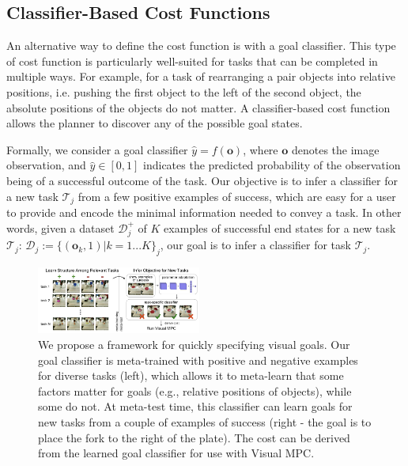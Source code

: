 \subsection{Classifier-Based Cost Functions}
\label{subsec:class_cost}
An alternative way to define the cost function is with a goal classifier. This type of cost function is particularly well-suited for tasks that can be completed in multiple ways. For example, for a task of rearranging a pair objects into relative positions, i.e. pushing the first object to the left of the second object, the absolute positions of the objects do not matter. A classifier-based cost function allows the planner to discover any of the possible goal states.

\newcommand{\task}{\mathcal{T}}
\newcommand{\data}{\mathcal{D}}
\newcommand{\obs}{\mathbf{o}}
\newcommand{\out}{y}
\newcommand{\posdata}{\data^+}
\newcommand{\testdata}{\data^\text{test}}
\newcommand{\loss}{\mathcal{L}}

Formally, we consider a goal classifier $\hat{\out} = f(\obs)$, where $\obs$ denotes the image observation, and $\hat{\out} \in [0,1]$ indicates the predicted probability of the observation being of a successful outcome of the task. Our objective is to infer a classifier for a new task $\task_j$ from a few positive examples of success, which are easy for a user to provide and encode the minimal information needed to convey a task. In other words, given a dataset $\posdata_j$ of $K$ examples of successful end states for a new task $\task_j$: $\data_j:=\{(\obs_k, 1) | k = 1...K\}_j$, our goal is to infer a classifier for task $\task_j$.

\begin{figure}
    \centering
    \includegraphics[width=0.48\textwidth]{images_cls/cls_fig.jpeg}
    \caption{\small We propose a framework for quickly specifying visual goals. Our goal classifier is meta-trained with positive and negative examples for diverse tasks (left), which allows it to meta-learn that some factors matter for goals (e.g., relative positions of objects), while some do not. At meta-test time, this classifier can learn goals for new tasks from a couple of examples of success (right - the goal is to place the fork to the right of the plate). The cost can be derived from the learned goal classifier for use with Visual MPC.}
    \label{fig:cls_fig}
    \vspace{-0.3cm}
\end{figure}

